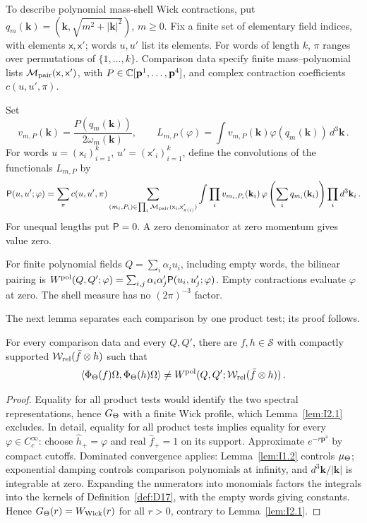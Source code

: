 To describe polynomial mass-shell Wick contractions, put $q_m(\mathbf k)=(\mathbf k,\sqrt{m^2+|\mathbf k|^2})$, $m\ge0$. Fix a finite set of elementary field indices, with elements $\mathsf x,\mathsf x'$; words $u,u'$ list its elements. For words of length $k$, $\pi$ ranges over permutations of $\{1,\ldots,k\}$. Comparison data specify finite mass--polynomial lists $\mathcal M_{\rm pair}(\mathsf x,\mathsf x')$, with $P\in\mathbb{C}[\mathbf p^1,\ldots,\mathbf p^4]$, and complex contraction coefficients $c(u,u',\pi)$.
\begin{definition}\label{def:D28}
Set
\begin{equation*}
v_{m,P}(\mathbf k)=\frac{P(q_m(\mathbf k))}{2\omega_m(\mathbf k)},\qquad
L_{m,P}(\varphi)=\int v_{m,P}(\mathbf k)\varphi(q_m(\mathbf k))\,d^3\mathbf k\,.
\end{equation*}
For words $u=(\mathsf x_i)_{i=1}^k$, $u'=(\mathsf x'_i)_{i=1}^k$, define the convolutions of the functionals $L_{m,P}$ by
\begin{equation*}
\mathsf P(u,u';\varphi)=\sum_\pi c(u,u',\pi)
\sum_{(m_i,P_i)\in\prod_i\mathcal M_{\rm pair}(\mathsf x_i,\mathsf x'_{\pi(i)})}
\int\prod_i v_{m_i,P_i}(\mathbf k_i)\,
\varphi\left(\sum_iq_{m_i}(\mathbf k_i)\right)\prod_i d^3\mathbf k_i\,.
\end{equation*}
For unequal lengths put $\mathsf P=0$. A zero denominator at zero momentum gives value zero.
\end{definition}
For finite polynomial fields $Q=\sum_i\alpha_i u_i$, including empty words, the bilinear pairing is $W^{\rm pol}(Q,Q';\varphi)=\sum_{i,j}\alpha_i\alpha'_j\mathsf P(u_i,u'_j;\varphi)$. Empty contractions evaluate $\varphi$ at zero. The shell measure has no $(2\pi)^{-3}$ factor.

The next lemma separates each comparison by one product test; its proof follows.
\begin{lemma}\label{lem:I2.2}
For every comparison data and every $Q,Q'$, there are $f,h\in\mathcal S$ with compactly supported $\mathcal{W}_{\mathrm{rel}}(\bar f\otimes h)$ such that
\begin{equation*}
\langle\Phi_\Theta(f)\Omega,\Phi_\Theta(h)\Omega\rangle
\ne W^{\rm pol}(Q,Q';\mathcal{W}_{\mathrm{rel}}(\bar f\otimes h))\,.
\end{equation*}
\end{lemma}
\begin{proof}
Equality for all product tests would identify the two spectral representations, hence $G_{\Theta}$ with a finite Wick profile, which Lemma~\ref{lem:I2.1} excludes. In detail, equality for all product tests implies equality for every $\varphi\in C_c^\infty$: choose $\widehat h_+=\varphi$ and real $\widehat f_+=1$ on its support. Approximate $e^{-r\mathbf p^4}$ by compact cutoffs. Dominated convergence applies: Lemma~\ref{lem:I1.2} controls $\mu_{\Theta}$; exponential damping controls comparison polynomials at infinity, and $d^3\mathbf k/|\mathbf k|$ is integrable at zero. Expanding the numerators into monomials factors the integrals into the kernels of Definition~\ref{def:D17}, with the empty words giving constants. Hence $G_{\Theta}(r)=W_{\rm Wick}(r)$ for all $r>0$, contrary to Lemma~\ref{lem:I2.1}.
\end{proof}

